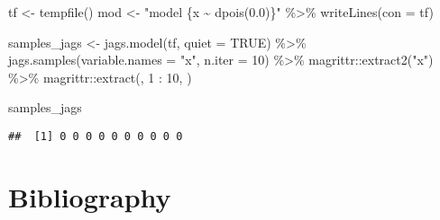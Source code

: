 \documentclass[
  10pt,
  a4paper,
]{article}
\newenvironment{Shaded}{\begin{snugshade}}{\end{snugshade}}
\newcommand{\AttributeTok}[1]{\textcolor[rgb]{0.77,0.63,0.00}{#1}}
\newcommand{\ConstantTok}[1]{\textcolor[rgb]{0.00,0.00,0.00}{#1}}
\newcommand{\DecValTok}[1]{\textcolor[rgb]{0.00,0.00,0.81}{#1}}
\newcommand{\FunctionTok}[1]{\textcolor[rgb]{0.00,0.00,0.00}{#1}}
\newcommand{\NormalTok}[1]{#1}
\newcommand{\OtherTok}[1]{\textcolor[rgb]{0.56,0.35,0.01}{#1}}
\newcommand{\SpecialCharTok}[1]{\textcolor[rgb]{0.00,0.00,0.00}{#1}}
\newcommand{\StringTok}[1]{\textcolor[rgb]{0.31,0.60,0.02}{#1}}
\begin{document}
\begin{Shaded}
\begin{Highlighting}[]
\NormalTok{tf }\OtherTok{\textless{}{-}} \FunctionTok{tempfile}\NormalTok{()}
\NormalTok{mod }\OtherTok{\textless{}{-}} \StringTok{"model \{x \textasciitilde{} dpois(0.0)\}"} \SpecialCharTok{\%\textgreater{}\%}
  \FunctionTok{writeLines}\NormalTok{(}\AttributeTok{con =}\NormalTok{ tf)}

\NormalTok{samples\_jags }\OtherTok{\textless{}{-}} \FunctionTok{jags.model}\NormalTok{(tf, }\AttributeTok{quiet =} \ConstantTok{TRUE}\NormalTok{) }\SpecialCharTok{\%\textgreater{}\%}
  \FunctionTok{jags.samples}\NormalTok{(}\AttributeTok{variable.names =} \StringTok{"x"}\NormalTok{, }\AttributeTok{n.iter =} \DecValTok{10}\NormalTok{) }\SpecialCharTok{\%\textgreater{}\%}
\NormalTok{  magrittr}\SpecialCharTok{::}\FunctionTok{extract2}\NormalTok{(}\StringTok{"x"}\NormalTok{) }\SpecialCharTok{\%\textgreater{}\%}
\NormalTok{  magrittr}\SpecialCharTok{::}\FunctionTok{extract}\NormalTok{(, }\DecValTok{1} \SpecialCharTok{:} \DecValTok{10}\NormalTok{, )}

\NormalTok{samples\_jags}
\end{Highlighting}
\end{Shaded}

\begin{verbatim}
##  [1] 0 0 0 0 0 0 0 0 0 0
\end{verbatim}

\hypertarget{bibliography}{%
\section*{Bibliography}\label{bibliography}}
\end{document}
